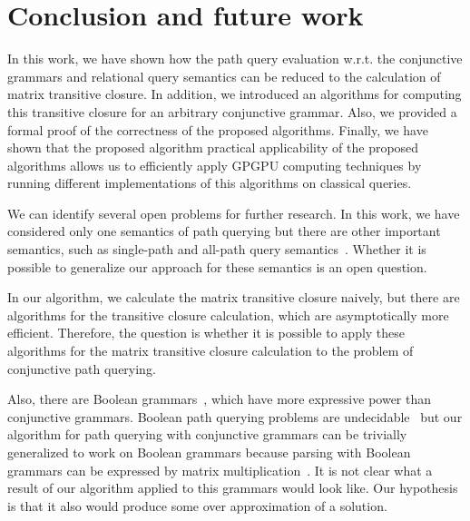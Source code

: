 \section{Conclusion and future work}
In this work, we have shown how the path query evaluation w.r.t. the conjunctive grammars and relational query semantics can be reduced to the calculation of matrix transitive closure. In addition, we introduced an algorithms for computing this transitive closure for an arbitrary conjunctive grammar. Also, we provided a formal proof of the correctness of the proposed algorithms. Finally, we have shown that the proposed algorithm practical applicability of the proposed algorithms allows us to efficiently apply GPGPU computing techniques by running different implementations of this algorithms on classical queries. 

We can identify several open problems for further research. In this work, we have considered only one semantics of path querying but there are other important semantics, such as single-path and all-path query semantics~\cite{hellingsPathQuerying}. Whether it is possible to generalize our approach for these semantics is an open question.

In our algorithm, we calculate the matrix transitive closure naively, but there are algorithms for the transitive closure calculation, which are asymptotically more efficient. Therefore, the question is whether it is possible to apply these algorithms for the matrix transitive closure calculation to the problem of conjunctive path querying.

Also, there are Boolean grammars~\cite{okhotinBoolean}, which have more expressive power than conjunctive grammars. Boolean path querying problems are undecidable~\cite{hellingsRelational} but our algorithm for path querying with conjunctive grammars can be trivially generalized to work on Boolean grammars because parsing with Boolean grammars can be expressed by matrix multiplication~\cite{okhotin_cyk}. It is not clear what a result of our algorithm applied to this grammars would look like. Our hypothesis is that it also would produce some over approximation of a solution.
